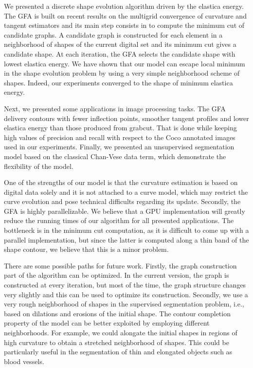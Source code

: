 \documentclass[smallextended]{svjour3}
\begin{document}
We presented a discrete shape evolution algorithm driven by the elastica energy. The GFA is built on recent results on the multigrid convergence of curvature and tangent estimators and its main step consists in to compute the minimum cut of candidate graphs. A candidate graph is constructed for each element in a neighborhood of shapes of the current digital set and its minimum cut gives a candidate shape. At each iteration, the GFA selects the candidate shape with lowest elastica energy. We have shown that our model can escape local minimum in the shape evolution problem by using a very simple neighborhood scheme of shapes. Indeed, our experiments converged to the shape of minimum elastica energy. 

Next, we presented some applications in image processing tasks. The GFA delivery contours with fewer inflection points, smoother tangent profiles and lower elastica energy than those produced from grabcut. That is done while keeping high values of precision and recall with respect to the Coco annotated images used in our experiments. Finally, we presented an unsupervised segmentation model based on the classical Chan-Vese data term, which demonstrate the flexibility of the model. 

One of the strengths of our model is that the curvature estimation is based on digital data solely and it is not attached to a curve model, which may restrict the curve evolution and pose technical difficults regarding its update. Secondly, the GFA is highly parallelizable. We believe that a GPU implementation will greatly reduce the running times of our algorithm for all presented applications. The bottleneck is in the minimum cut computation, as it is difficult to come up with a parallel implementation, but since the latter is computed along a thin band of the shape contour, we believe that this is a minor problem.

There are some possible paths for future work. Firstly, the graph construction part of the algorithm can be optimized. In the current version, the graph is constructed at every iteration, but most of the time, the graph structure changes very slightly and this can be used to optimize its construction. Secondly, we use a very rough neighborhood of shapes in the supervised segmentation problem, i.e., based on dilations and erosions of the initial shape. The contour completion property of the model can be better exploited by employing different neighborhoods. For example, we could alongate the initial shapes in regions of high curvature to obtain a stretched neighborhood of shapes. This could be particularly useful in the segmentation of thin and elongated objects such as blood vessels.




\end{document}
